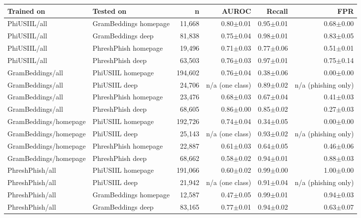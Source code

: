 {\footnotesize
\begin{tabular}{llrrrr}
\toprule
\textbf{Trained on} & \textbf{Tested on} & \textbf{n} & \textbf{AUROC} & \textbf{Recall} & \textbf{FPR} \\
\midrule
PhiUSIIL/all & GramBeddings homepage & 11{,}668 & 0.80$\pm$0.01 & 0.95$\pm$0.01 & 0.68$\pm$0.00 \\
PhiUSIIL/all & GramBeddings deep & 81{,}838 & 0.75$\pm$0.04 & 0.98$\pm$0.01 & 0.83$\pm$0.05 \\
PhiUSIIL/all & PhreshPhish homepage & 19{,}496 & 0.71$\pm$0.03 & 0.77$\pm$0.06 & 0.51$\pm$0.01 \\
PhiUSIIL/all & PhreshPhish deep & 63{,}503 & 0.76$\pm$0.03 & 0.97$\pm$0.01 & 0.75$\pm$0.14 \\
GramBeddings/all & PhiUSIIL homepage & 194{,}602 & 0.76$\pm$0.04 & 0.38$\pm$0.06 & 0.00$\pm$0.00 \\
GramBeddings/all & PhiUSIIL deep & 24{,}706 & n/a (one class) & 0.89$\pm$0.02 & n/a (phishing only) \\
GramBeddings/all & PhreshPhish homepage & 23{,}476 & 0.68$\pm$0.03 & 0.67$\pm$0.04 & 0.41$\pm$0.03 \\
GramBeddings/all & PhreshPhish deep & 68{,}605 & 0.86$\pm$0.00 & 0.85$\pm$0.02 & 0.27$\pm$0.03 \\
GramBeddings/homepage & PhiUSIIL homepage & 192{,}726 & 0.74$\pm$0.04 & 0.34$\pm$0.05 & 0.00$\pm$0.00 \\
GramBeddings/homepage & PhiUSIIL deep & 25{,}143 & n/a (one class) & 0.93$\pm$0.02 & n/a (phishing only) \\
GramBeddings/homepage & PhreshPhish homepage & 22{,}887 & 0.61$\pm$0.03 & 0.64$\pm$0.05 & 0.46$\pm$0.06 \\
GramBeddings/homepage & PhreshPhish deep & 68{,}662 & 0.58$\pm$0.02 & 0.94$\pm$0.01 & 0.88$\pm$0.03 \\
PhreshPhish/all & PhiUSIIL homepage & 191{,}066 & 0.60$\pm$0.02 & 0.99$\pm$0.00 & 1.00$\pm$0.00 \\
PhreshPhish/all & PhiUSIIL deep & 21{,}942 & n/a (one class) & 0.91$\pm$0.04 & n/a (phishing only) \\
PhreshPhish/all & GramBeddings homepage & 12{,}587 & 0.47$\pm$0.05 & 0.99$\pm$0.01 & 0.94$\pm$0.03 \\
PhreshPhish/all & GramBeddings deep & 83{,}165 & 0.77$\pm$0.01 & 0.94$\pm$0.02 & 0.63$\pm$0.07 \\
\bottomrule
\end{tabular}
}
